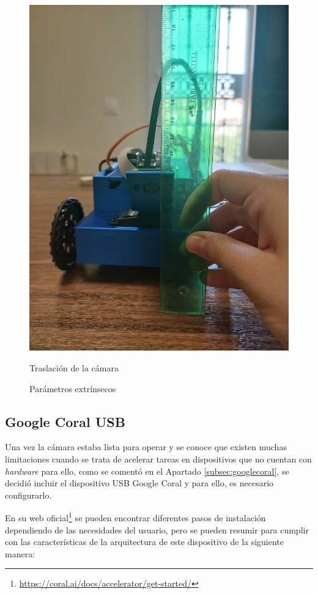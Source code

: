 \begin{figure}[ht!]
\begin{minipage}{0.45\linewidth}
		\includegraphics[width=\linewidth]{figs/cap6/traslacion.jpeg}
		\caption*{\centering Traslación de la cámara} 
	\end{minipage}
	\caption{Parámetros extrínsecos}
	\label{fig:extrinseco}
\end{figure}


\subsection{Google Coral USB}
\label{subsec:configgcoral}

Una vez la cámara estaba lista para operar y se conoce que existen muchas limitaciones cuando se trata de acelerar tareas en dispositivos que no cuentan con \textit{hardware} para ello, como se comentó en el Apartado \ref{subsec:googlecoral}, se decidió incluir el dispositivo USB Google Coral y para ello, es necesario configurarlo.

En su web oficial\footnote{\url{https://coral.ai/docs/accelerator/get-started/}} se pueden encontrar diferentes pasos de instalación dependiendo de las necesidades del usuario, pero se pueden resumir para cumplir con las características de la arquitectura de este dispositivo de la siguiente manera:



